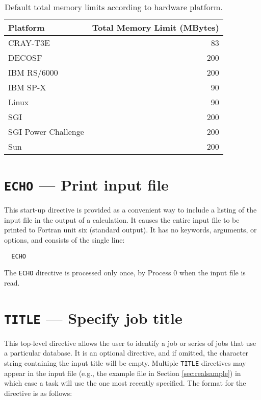 
\begin{table}

\center

\label{tbl:default-memory-limits}

\begin{tabular}{lr}
\hline\hline
Platform        & Total Memory Limit (MBytes) \\
\hline
CRAY-T3E        & 83 \\
DECOSF          & 200 \\
IBM RS/6000     & 200 \\
IBM SP-X        & 90 \\
Linux           & 90 \\
SGI             & 200 \\
SGI Power Challenge  & 200 \\
Sun             & 200 \\
\hline\hline
\end{tabular}

\caption{Default total memory limits according to hardware platform.}


\end{table}

\section{{\tt ECHO} --- Print input file}
\label{sec:echo}

This start-up directive is provided as a convenient way to include a
listing of the input file in the output of a calculation.  It causes
the entire input file to be printed to Fortran unit six (standard
output).  It has no keywords, arguments, or options, and consists of
the single line:

\begin{verbatim}
  ECHO
\end{verbatim}

The \verb+ECHO+ directive is processed only
once, by Process 0 when the input file is read.

\section{{\tt TITLE} --- Specify job title}

This top-level directive allows the user to identify a job or series
of jobs that use a particular database.  It is an optional directive,
and if omitted, the character string containing the input title will
be empty.  Multiple {\tt TITLE} directives may appear in the input
file (e.g., the example file in Section \ref{sec:realsample}) in which
case a task will use the one most recently specified.  The format for
the directive is as follows:

